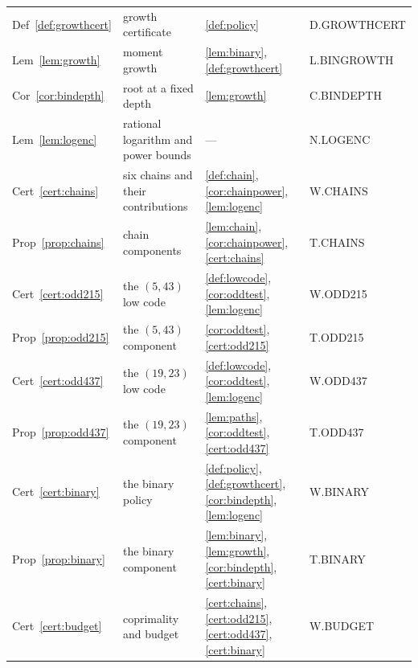 \documentclass[11pt]{article}
\theoremstyle{definition}
\theoremstyle{remark}
\begin{document}
{\begin{longtable}{@{}p{2.3cm}p{4.9cm}p{4.5cm}>{\footnotesize\ttfamily}p{2.9cm}@{}}
Def~\ref{def:growthcert} & growth certificate & \ref{def:policy} & D.GROWTHCERT\\
Lem~\ref{lem:growth} & moment growth & \ref{lem:binary}, \ref{def:growthcert} & L.BINGROWTH\\
Cor~\ref{cor:bindepth} & root at a fixed depth & \ref{lem:growth} & C.BINDEPTH\\
Lem~\ref{lem:logenc} & rational logarithm and power bounds & --- & N.LOGENC\\
Cert~\ref{cert:chains} & six chains and their contributions & \ref{def:chain}, \ref{cor:chainpower}, \ref{lem:logenc} & W.CHAINS\\
Prop~\ref{prop:chains} & chain components & \ref{lem:chain}, \ref{cor:chainpower}, \ref{cert:chains} & T.CHAINS\\
Cert~\ref{cert:odd215} & the $(5,43)$ low code & \ref{def:lowcode}, \ref{cor:oddtest}, \ref{lem:logenc} & W.ODD215\\
Prop~\ref{prop:odd215} & the $(5,43)$ component & \ref{cor:oddtest}, \ref{cert:odd215} & T.ODD215\\
Cert~\ref{cert:odd437} & the $(19,23)$ low code & \ref{def:lowcode}, \ref{cor:oddtest}, \ref{lem:logenc} & W.ODD437\\
Prop~\ref{prop:odd437} & the $(19,23)$ component & \ref{lem:paths}, \ref{cor:oddtest}, \ref{cert:odd437} & T.ODD437\\
Cert~\ref{cert:binary} & the binary policy & \ref{def:policy}, \ref{def:growthcert}, \ref{cor:bindepth}, \ref{lem:logenc} & W.BINARY\\
Prop~\ref{prop:binary} & the binary component & \ref{lem:binary}, \ref{lem:growth}, \ref{cor:bindepth}, \ref{cert:binary} & T.BINARY\\
Cert~\ref{cert:budget} & coprimality and budget & \ref{cert:chains}, \ref{cert:odd215}, \ref{cert:odd437}, \ref{cert:binary} & W.BUDGET\\
\end{longtable}
}
\end{document}
